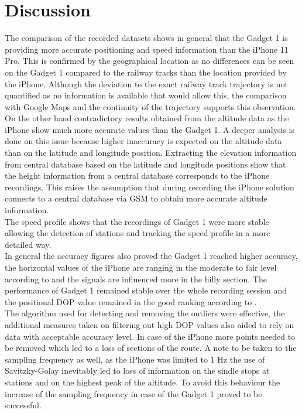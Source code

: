 \documentclass{article}
\begin{document}
	\section{Discussion}
		The comparison of the recorded datasets shows in general that the Gadget 1 is providing more accurate positioning and speed information than the iPhone 11 Pro. This is confirmed by the geographical location as no differences can be seen on the Gadget 1 compared to the railway tracks than the location provided by the iPhone. Although the deviation to the exact railway track trajectory is not quantified as no information is available that would allow this, the comparison with Google Maps and the continuity of the trajectory supports this observation. \\
		On the other hand contradictory results obtained from the altitude data as the iPhone show much more accurate values than the Gadget 1. A deeper analysis is done on this issue because higher inaccuracy is expected on the altitude data than on the latitude and longitude position. Extracting the elevation information from central database based on the latitude and longitude positions show that the height information from a central database \cite{GPSVisualizerAssign} corresponds to the iPhone recordings. This raises the assumption that during recording the iPhone solution connects to a central database via GSM to obtain more accurate altitude information. \\ 
		The speed profile shows that the recordings of Gadget 1 were more stable allowing the detection of stations and tracking the speed profile in a more detailed way. \\
		In general the accuracy figures also proved the Gadget 1 reached higher accuracy, the horizontal values of the iPhone are ranging in the moderate to fair level according to \cite{tahsinAnalysisDOPIts2015} and the signals are influenced more in the hilly section. The performance of Gadget 1 remained stable over the whole recording session and the positional DOP value remained in the good ranking according to \cite{tahsinAnalysisDOPIts2015}. \\
		The algorithm used for detecting and removing the outliers were effective, the additional measures taken on filtering out high DOP values also aided to rely on data with acceptable accuracy level. In case of the iPhone more points needed to be removed which led to a loss of sections of the route. A note to be taken to the sampling frequency as well, as the iPhone was limited to 1 Hz the use of Savitzky-Golay inevitably led to loss of information on the sindle stops at stations and on the highest peak of the altitude. To avoid this behaviour the increase of the sampling frequency in case of the Gadget 1 proved to be successful.
\end{document}

